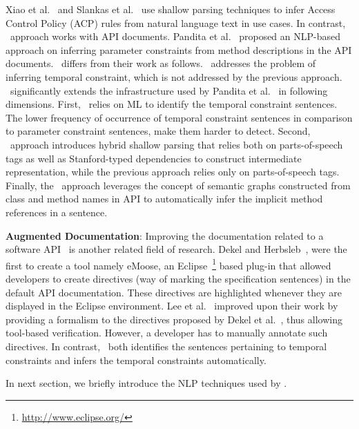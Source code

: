 Xiao et al.~\cite{XiaoFSE2012} and Slankas et al.~\cite{johnSlankasPASSAT13} use shallow parsing techniques to infer Access Control Policy (ACP) rules from natural language text in use cases. In contrast, \tool\ approach works with API documents.
Pandita et al.~\cite{pandita12:inferring} proposed an NLP-based approach on inferring parameter constraints from method descriptions in the API documents. \tool\ differs from their work as follows.
\tool\ addresses the problem of inferring temporal constraint, which is not addressed by the previous approach. \tool\ significantly extends the infrastructure used by Pandita et al.~\cite{pandita12:inferring} in following dimensions.
First, \tool\ relies on ML to identify the temporal constraint sentences. The lower frequency of occurrence of temporal constraint sentences in comparison to parameter constraint sentences, make them harder to detect.
Second, \tool\ approach introduces hybrid shallow parsing that relies both on parts-of-speech tags as well as Stanford-typed dependencies to construct intermediate representation, while the previous approach relies only on parts-of-speech tags.
Finally, the \tool\ approach leverages the concept of semantic graphs constructed from class and method names in API to automatically infer the implicit method references in a sentence. 


\textbf{Augmented Documentation}:
Improving the documentation related to a software API~\cite{Dekel2009,tan2011acomment} is another related field of research.
Dekel and Herbsleb~\cite{Dekel2009}, were the first to create a tool namely eMoose,
an Eclipse~\footnote{\url{http://www.eclipse.org/}} based plug-in that allowed developers to create directives
(way of marking the specification sentences) in the default API documentation.
These directives are highlighted whenever they are displayed in the Eclipse environment.
Lee et al.~\cite{lee2012towards} improved upon their work by providing a formalism to the directives proposed by Dekel et al.~\cite{Dekel2009},
thus allowing tool-based verification.
However, a developer has to manually annotate such directives.
In contrast, \tool\ both identifies the sentences pertaining to temporal constraints and infers the temporal constraints automatically. 

In next section, we briefly introduce the NLP techniques used by \tool.